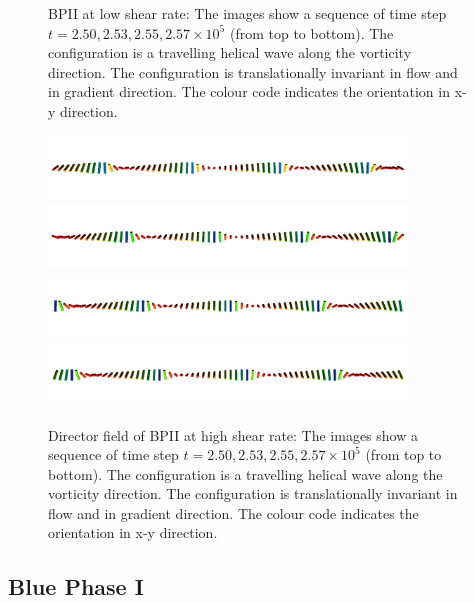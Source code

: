 \documentclass[aps,pre,reprint,superscriptaddress]{revtex4}
\newcommand{\e}[1]{\times10^{#1}}
\begin{document}
\begin{figure}[h]
\caption{BPII at low shear rate: The images show a sequence of time step $t=2.50, 2.53,2.55, 2.57\e{5}$ (from top to bottom). The configuration is a travelling helical wave along the vorticity direction. The configuration is translationally invariant in flow and in gradient direction. The colour code indicates the orientation in x-y direction.}
\label{bp2-low}
\end{figure}

\begin{figure}[h]
\includegraphics[width=0.85\textwidth]{dir+y-250k_run949.png}
\includegraphics[width=0.85\textwidth]{dir+y-253k_run949.png}
\includegraphics[width=0.85\textwidth]{dir+y-255k_run949.png}
\includegraphics[width=0.85\textwidth]{dir+y-257k_run949.png}
\caption{Director field of BPII at high shear rate: The images show a sequence of time step $t=2.50, 2.53,2.55, 2.57\e{5}$ (from top to bottom). The configuration is a travelling helical wave along the vorticity direction. The configuration is translationally invariant in flow and in gradient direction. The colour code indicates the orientation in x-y direction.}
\label{bp2-high}
\end{figure}

\clearpage

\subsection{Blue Phase I}
\end{document}
